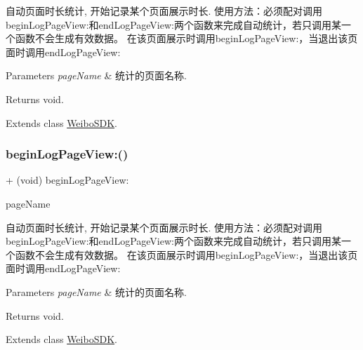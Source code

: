 自动页面时长统计, 开始记录某个页面展示时长. 使用方法：必须配对调用begin\+Log\+Page\+View\+:和end\+Log\+Page\+View\+:两个函数来完成自动统计，若只调用某一个函数不会生成有效数据。 在该页面展示时调用begin\+Log\+Page\+View\+:，当退出该页面时调用end\+Log\+Page\+View\+: 
\begin{DoxyParams}{Parameters}
{\em page\+Name} & 统计的页面名称. \\
\hline
\end{DoxyParams}
\begin{DoxyReturn}{Returns}
void. 
\end{DoxyReturn}


Extends class \mbox{\hyperlink{interface_weibo_s_d_k_ae9b18093f71e740c51f254fb517e818d}{Weibo\+S\+DK}}.

\mbox{\label{category_weibo_s_d_k_07_statistics_08_ae9b18093f71e740c51f254fb517e818d}} 
\subsubsection{\texorpdfstring{begin\+Log\+Page\+View\+:()}{beginLogPageView:()}\hspace{0.1cm}{\footnotesize\ttfamily [3/3]}}
{\footnotesize\ttfamily + (void) begin\+Log\+Page\+View\+: \begin{DoxyParamCaption}\item[{(N\+S\+String $\ast$)}]{page\+Name }\end{DoxyParamCaption}}

自动页面时长统计, 开始记录某个页面展示时长. 使用方法：必须配对调用begin\+Log\+Page\+View\+:和end\+Log\+Page\+View\+:两个函数来完成自动统计，若只调用某一个函数不会生成有效数据。 在该页面展示时调用begin\+Log\+Page\+View\+:，当退出该页面时调用end\+Log\+Page\+View\+: 
\begin{DoxyParams}{Parameters}
{\em page\+Name} & 统计的页面名称. \\
\hline
\end{DoxyParams}
\begin{DoxyReturn}{Returns}
void. 
\end{DoxyReturn}


Extends class \mbox{\hyperlink{interface_weibo_s_d_k_ae9b18093f71e740c51f254fb517e818d}{Weibo\+S\+DK}}.

